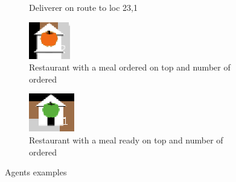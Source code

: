 \begin{center}
\begin{figure}
\begin{subfigure}[m]{0.1\textwidth}
         \caption{Deliverer on route to loc 23,1}
     \end{subfigure}
     \hfill
     \begin{subfigure}[m]{0.1\textwidth}
         \centering
         \includegraphics[width=\textwidth]{sections/pics/meal_prep}
         \caption{Restaurant with a meal ordered on top and number of ordered}
     \end{subfigure}
      \hfill
     \begin{subfigure}[m]{0.1\textwidth}
         \centering
         \includegraphics[width=\textwidth]{sections/pics/meal_ready}
         \caption{Restaurant with a meal ready on top and number of ordered}
     \end{subfigure}
        \caption{Agents examples}
        \label{fig:agents}
\end{figure}
\end{center}

